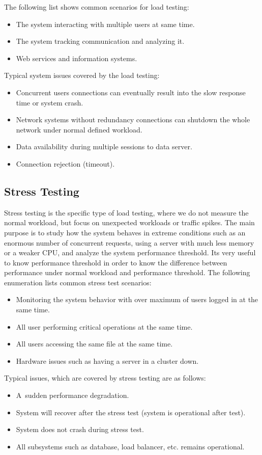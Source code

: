 The following list shows common scenarios for load testing:
\begin{itemize}
	\setlength\itemsep{0em}
	\item The system interacting with multiple users at same time.
	\item The system tracking communication and analyzing it.
	\item Web services and information systems.
\end{itemize}
Typical system issues covered by the load testing:
\begin{itemize}
	\setlength\itemsep{0em}
	\item Concurrent users connections can eventually result into the slow response time or system crash.
	\item Network systems without redundancy connections can shutdown the whole network under normal defined workload.
	\item Data availability during multiple sessions to data server.
	\item Connection rejection (timeout).
\end{itemize}

\subsection*{Stress Testing}
\label{Stress Testing}
Stress testing is the specific type of load testing, where we do not measure the normal workload, but focus on unexpected workloads or traffic spikes. The main purpose is to study how the system behaves in extreme conditions such as an enormous number of concurrent requests, using a server with much less memory or a weaker CPU, and analyze the system performance threshold. Its very useful to know performance threshold in order to know the difference between performance under normal workload and performance threshold. The following enumeration lists common stress test scenarios:
\begin{itemize}
	\setlength\itemsep{0em}
	\item Monitoring the system behavior with over maximum of users logged in at the same time.
	\item All user performing critical operations at the same time.
	\item All users accessing the same file at the same time.
	\item Hardware issues such as having a server in a cluster down.
\end{itemize}
Typical issues, which are covered by stress testing are as follows:
\begin{itemize}
	\setlength\itemsep{0em}
	\item A~sudden performance degradation.
	\item System will recover after the stress test (system is operational after test).
	\item System does not crash during stress test.
	\item All subsystems such as database, load balancer, etc. remains operational.
\end{itemize}

